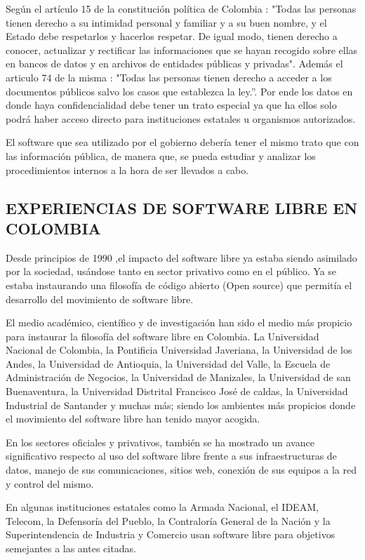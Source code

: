Según el artículo 15 de la constitución política de Colombia :
"Todas las personas tienen derecho a su intimidad personal y
familiar y a su buen nombre, y el Estado debe respetarlos y
hacerlos respetar. De igual modo, tienen derecho a conocer,
actualizar y rectificar las informaciones que se hayan recogido
sobre ellas en bancos de datos y en archivos de entidades
públicas y privadas". Además el articulo 74 de la misma : "Todas
las personas tienen derecho a acceder a los documentos
públicos salvo los casos que establezca la ley.”. Por ende los
datos en donde haya confidencialidad debe tener un trato
especial ya que ha ellos solo podrá haber acceso directo para
instituciones estatales u organismos autorizados.

El software que sea utilizado por el gobierno debería tener el
mismo trato que con las información pública, de manera que, se
pueda estudiar y analizar los procedimientos internos a la hora
de ser llevados a cabo.

\subsection*{EXPERIENCIAS DE SOFTWARE LIBRE EN COLOMBIA}
 
Desde principios de 1990 ,el impacto del software libre ya
estaba siendo asimilado por la sociedad, usándose tanto en
sector privativo como en el público. Ya se estaba instaurando
una filosofía de código abierto (Open source) que permitía el
desarrollo del movimiento de software libre.

El medio académico, científico y de investigación han sido el
medio más propicio para instaurar la filosofía del software libre
en Colombia. La Universidad Nacional de Colombia, la Pontificia
Universidad Javeriana, la Universidad de los Andes, la
Universidad de Antioquia, la Universidad del Valle, la Escuela de
Administración de Negocios, la Universidad de Manizales, la
Universidad de san Buenaventura, la Universidad Distrital
Francisco José de caldas, la Universidad Industrial de Santander
y muchas más; siendo los ambientes más propicios donde el
movimiento del software libre han tenido mayor acogida.

En los sectores oficiales y privativos, también se ha mostrado un
avance significativo respecto al uso del software libre frente a
sus infraestructuras de datos, manejo de sus comunicaciones,
sitios web, conexión de sus equipos a la red y control del mismo.

En algunas instituciones estatales como la Armada Nacional, el
IDEAM, Telecom, la Defensoría del Pueblo, la Contraloría
General de la Nación y la Superintendencia de Industria y
Comercio usan software libre para objetivos semejantes a las
antes citadas.

